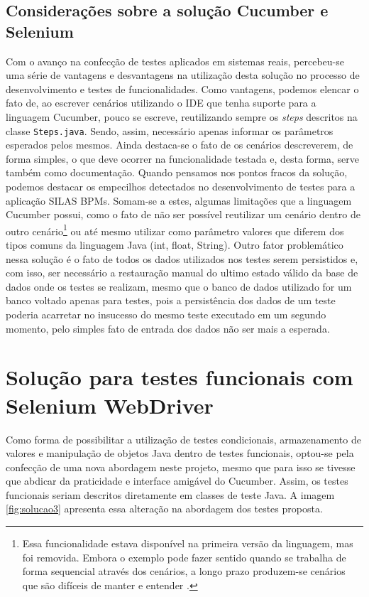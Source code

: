 \documentclass[tg]{mdtufsm}
\begin{document}
\subsection{Considerações sobre a solução Cucumber e Selenium}
Com o avanço na confecção de testes aplicados em sistemas reais, percebeu-se uma série de vantagens e desvantagens na utilização desta solução no processo de desenvolvimento e testes de funcionalidades.
Como vantagens, podemos elencar o fato de, ao escrever cenários utilizando o IDE que tenha suporte para a linguagem Cucumber, pouco se escreve, reutilizando sempre os \emph{steps} descritos na classe \texttt{Steps.java}. Sendo, assim, necessário apenas informar os parâmetros esperados pelos mesmos. Ainda destaca-se o fato de os cenários descreverem, de forma simples, o que deve ocorrer na funcionalidade testada e, desta forma, serve também como documentação.
Quando pensamos nos pontos fracos da solução, podemos destacar os empecilhos detectados no desenvolvimento de testes para a aplicação SILAS BPMs. Somam-se a estes, algumas limitações que a linguagem Cucumber possui, como o fato de não ser possível reutilizar um cenário dentro de outro cenário\footnote{Essa funcionalidade estava disponível na primeira versão da linguagem, mas foi removida. Embora o exemplo pode fazer sentido quando se trabalha de forma sequencial através dos cenários, a longo prazo produzem-se cenários que são difíceis de manter e entender \cite{givenscenario}. } ou até mesmo utilizar como parâmetro valores que diferem dos tipos comuns da linguagem Java (int, float, String). Outro fator problemático nessa solução é o fato de todos os dados utilizados nos testes serem persistidos e, com isso, ser necessário a restauração manual do ultimo estado válido da base de dados onde os testes se realizam, mesmo que o banco de dados utilizado for um banco voltado apenas para testes, pois a persistência dos dados de um teste poderia acarretar no insucesso do mesmo teste executado em um segundo momento, pelo simples fato de entrada dos dados não ser mais a esperada.

\section{Solução para testes funcionais com Selenium WebDriver}
Como forma de possibilitar a utilização de testes condicionais, armazenamento de valores e manipulação de objetos Java dentro de testes funcionais, optou-se pela confecção de uma nova abordagem neste projeto, mesmo que para isso se tivesse que abdicar da praticidade e interface amigável do Cucumber. Assim, os testes funcionais seriam descritos diretamente em classes de teste Java. A imagem \ref{fig:solucao3} apresenta essa alteração na abordagem dos testes proposta. 
\end{document}

